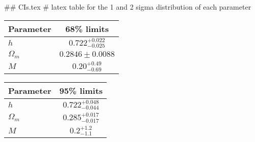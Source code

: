 ## CIs.tex
# latex table for the 1 and 2 sigma distribution of each parameter

\begin{tabular} { l  c}
 Parameter &  68\% limits\\
\hline
{\boldmath$h              $} & $0.722^{+0.022}_{-0.025}   $\\
{\boldmath$\Omega_m       $} & $0.2846\pm 0.0088          $\\
{\boldmath$M              $} & $0.20^{+0.49}_{-0.69}      $\\
\hline
\end{tabular}

\begin{tabular} { l  c}
 Parameter &  95\% limits\\
\hline
{\boldmath$h              $} & $0.722^{+0.048}_{-0.044}   $\\
{\boldmath$\Omega_m       $} & $0.285^{+0.017}_{-0.017}   $\\
{\boldmath$M              $} & $0.2^{+1.2}_{-1.1}         $\\
\hline
\end{tabular}
